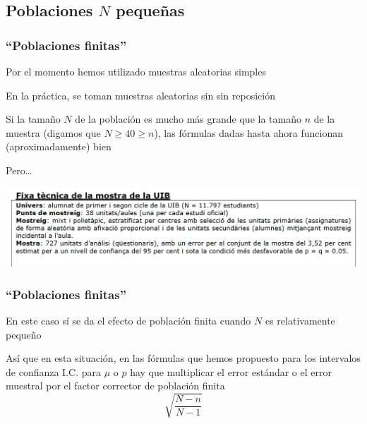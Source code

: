 \documentclass[12pt,t]{beamer}\usepackage[]{graphicx}\usepackage[]{color}
\renewcommand{\emph}[1]{{\color{red}#1}}
\renewcommand{\geq}{\geqslant}
\theoremstyle{plain}
\theoremstyle{definition}
\begin{document}
\subsection{Poblaciones $N$ pequeñas}
\begin{frame}
\frametitle{``Poblaciones finitas''}
Por el momento hemos utilizado  muestras  aleatorias simples
\medskip

En la práctica,  se toman muestras aleatorias sin sin reposición
\medskip

Si la  tamaño  $N$ de la población es mucho más grande que la  tamaño  $n$ de la muestra (digamos que  $N\geq 40\geq n$), las fórmulas dadas hasta ahora  funcionan (aproximadamente) bien
\medskip

Pero\ldots
\vspace*{-4ex}

\begin{center}
\hspace*{-0.5cm}\includegraphics[width=1.1\linewidth]{plagiUIB2.jpg}
\end{center}


\end{frame}

\begin{frame}
\frametitle{``Poblaciones finitas''}

En este caso sí se da el efecto de \emph{población finita} cuando $N$ es relativamente pequeño
\medskip

Así que en esta situación, en las fórmulas que hemos propuesto para los intervalos de confianza  I.C. para $\mu$ o $p$ hay que multiplicar el error estándar o el error muestral por el factor corrector de población finita
$$
\sqrt{\frac{N-n}{N-1}}
$$

\end{frame}
\end{document}
